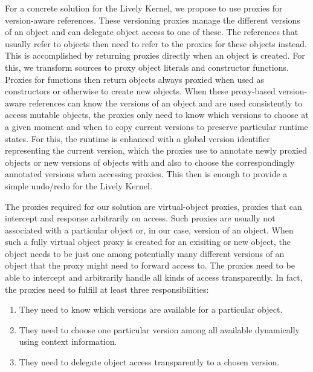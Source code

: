 For a concrete solution for the Lively Kernel, we propose to use proxies for version-aware references.
These versioning proxies manage the different versions of an object and can delegate object access to one of these.
The references that usually refer to objects then need to refer to the proxies for these objects instead. 
This is accomplished by returning proxies directly when an object is created.
For this, we transform sources to proxy object literals and constructor functions.
Proxies for functions then return objects always proxied when used as constructors or otherwise to create new objects.
When these proxy-based version-aware references can know the versions of an object and are used consistently to access mutable objects, the proxies only need to know which versions to choose at a given moment and when to copy current versions to preserve particular runtime states.
For this, the runtime is enhanced with a global version identifier representing the current version, which the proxies use to annotate newly proxied objects or new versions of objects with and also to choose the correspondingly annotated versions when accessing proxies.
This then is enough to provide a simple undo/redo for the Lively Kernel.


The proxies required for our solution are virtual-object proxies, proxies that can intercept and response arbitrarily on access.
Such proxies are usually not associated with a particular object or, in our case, version of an object.
When such a fully virtual object proxy is created for an exisiting or new object, the object needs to be just one among potentially many different versions of an object that the proxy might need to forward access to.
The proxies need to be able to intercept and arbitrarily handle all kinds of access transparently.
In fact, the proxies need to fulfill at least three responsibilities:
\begin{enumerate}
    \item They need to know which versions are available for a particular object.
    \item They need to choose one particular version among all available dynamically using context information.
    \item They need to delegate object access transparently to a chosen version.
\end{enumerate}



